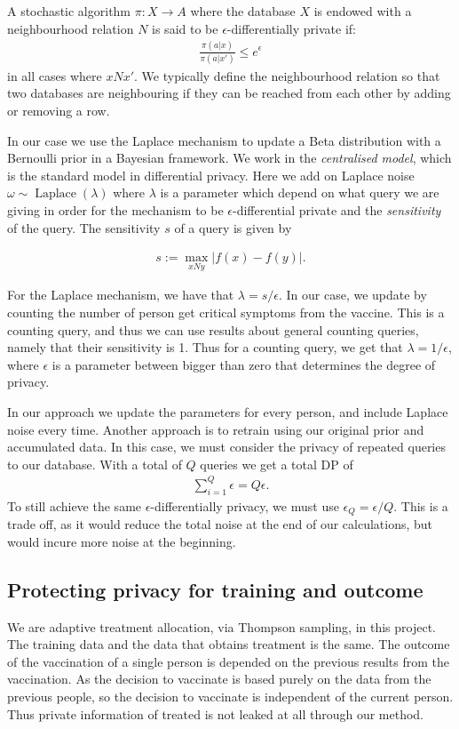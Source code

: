 A stochastic algorithm $\pi : X \rightarrow A$ where the database $X$ is endowed with a neighbourhood relation $N$ is said to be $\epsilon$-differentially private if:
\begin{align*}
    \frac{\pi(a|x)}{\pi(a|x')} \leq e^\epsilon
\end{align*}
in all cases where $xNx'$. We typically define the neighbourhood relation so that two databases are neighbouring if they can be reached from each other by adding or removing a row. 
    
In our case we use the Laplace mechanism to update a Beta distribution with a Bernoulli prior in a Bayesian framework. We work in the \emph{centralised model}, which is the standard model in differential privacy. Here we add on Laplace noise $\omega \sim \operatorname{Laplace}(\lambda)$ where $\lambda$ is a parameter which depend on what query we are giving in order for the mechanism to be $\epsilon$-differential private and the \emph{sensitivity} of the query. The sensitivity $s$ of a query is given by 

\begin{align*}
    s := \max_{xNy} |f(x) - f(y)|.
\end{align*}

For the Laplace mechanism, we have that $\lambda = s/\epsilon$. In our case, we update by counting the number of person get critical symptoms from the vaccine. This is a counting query, and thus we can use results about general counting queries, namely that their sensitivity is 1. Thus for a counting query, we get that $\lambda = 1/\epsilon$, where $\epsilon$ is a parameter between bigger than zero that determines the degree of privacy. 

In our approach we update the parameters for every person, and include Laplace noise every time. Another approach is to retrain using our original prior and accumulated data. In this case, we must consider the privacy of repeated queries to our database. With a total of $Q$ queries we get a total DP of
\begin{align*}
    \sum_{i=1}^Q\epsilon = Q\epsilon.
\end{align*}
To still achieve the same $\epsilon$-differentially privacy, we must use $\epsilon_Q = \epsilon/Q$. This is a trade off, as it would reduce the total noise at the end of our calculations, but would incure more noise at the beginning. 

\subsection*{Protecting privacy for training and outcome}
We are adaptive treatment allocation, via Thompson sampling, in this project. The training data and the data that obtains treatment is the same. The outcome of the vaccination of a single person is depended on the previous results from the vaccination. 
As the decision to vaccinate is based purely on the data from the previous people, so the decision to vaccinate is independent of the current person. Thus private information of treated is not leaked at all through our method. 

